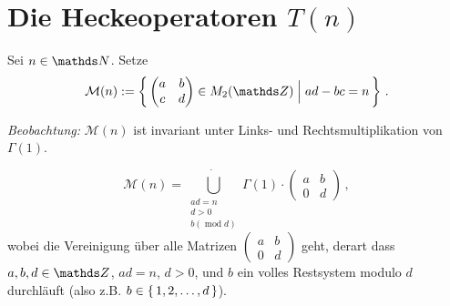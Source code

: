 \section{Die Heckeoperatoren $T(n)$}

\begin{defi}\label{defiM(n)}
Sei $n \in \NN$. Setze 
\[
\mathcal M(n) := \Set{ \abcd \in M_2(\ZZ) \Bigm| ad - bc = n }
\,.
\]
\end{defi}

\emph{Beobachtung:} $\mathcal M(n)$ ist invariant unter Links- und Rechtsmultiplikation von $\Gamma (1)$. 

\begin{lemm}\label{lemma:Mn_schoen}
\[
\mathcal M (n) = \dot{\bigcup_{\substack{ad = n\\ d > 0\\
b (\operatorname{mod} d)}}} \Gamma(1) \cdot 
\begin{pmatrix}
a & b\\
0 & d
\end{pmatrix}
\,,
\]
wobei die Vereinigung über alle Matrizen $\begin{pmatrix}a&b\\0&d\end{pmatrix}$ geht, derart dass $a,b,d \in \ZZ$, $ad = n$, $d > 0$, und $b$ ein volles Restsystem modulo $d$ durchläuft (also z.B. $b \in \left\{\,1, 2, \ldots, d\,\right\}$).
\end{lemm}

